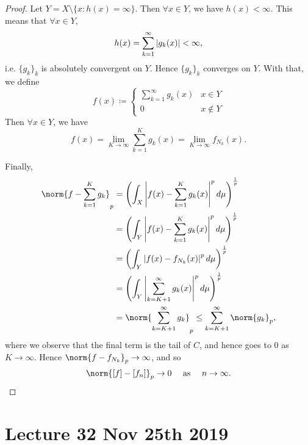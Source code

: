 \documentclass[notoc,notitlepage]{tufte-book}
\begin{document}
\begin{proof}
  Let $Y = X \setminus \{ x : h(x) = \infty \}$.
  Then $\forall x \in Y$, we have $h(x) < \infty$.
  This means that $\forall x \in Y$,
  \begin{equation*}
    h(x) = \sum_{k=1}^{\infty} \left|g_k(x)\right| < \infty,
  \end{equation*}
  i.e. $\{ g_k \}_k$ is absolutely convergent on $Y$.
  Hence $\{ g_k \}_k$ converges on $Y$.
  With that, we define
  \begin{equation*}
    f(x) \coloneqq \begin{cases}
      \sum_{k=1}^{\infty} g_k(x) & x \in Y \\
      0                          & x \notin Y
    \end{cases}
  \end{equation*}
  Then $\forall x \in Y$,  we have
  \begin{equation*}
    f(x) = \lim_{K \to \infty} \sum_{k=1}^{K} g_k(x)
    = \lim_{K \to \infty} f_{N_k}(x).
  \end{equation*}

  Finally,
  \begin{align*}
    \norm{f - \sum_{k=1}^{K} g_k}_p
    &= \left( \int_{X}
      \abs{f(x) - \sum_{k=1}^{K} g_k(x)}^p \dif{\mu}
    \right)^{\frac{1}{p}} \\
    &= \left( \int_{Y}
      \abs{f(x) - \sum_{k=1}^{K} g_k(x)}^p \dif{\mu}
    \right)^{\frac{1}{p}} \\
    &= \left( \int_{Y} \abs{f(x) - f_{N_k}(x)}^p \dif{\mu} \right)^{\frac{1}{p}} \\
    &= \left( \int_{Y}
      \abs{\sum_{k = K+1}^{\infty} g_k(x)}^p \dif{\mu}
    \right)^{\frac{1}{p}} \\
    &= \norm{ \sum_{k=K+1}^{\infty} g_k }_p
     \leq \sum_{k = K+1}^{\infty} \norm{g_k}_p,
  \end{align*}
  where we observe that the final term is the tail of $C$,
  and hence goes to $0$ as $K \to \infty$.
  Hence $\norm{f - f_{N_k}}_p \to \infty$, and so
  \begin{equation*}
    \norm{[f] - [f_n]}_p \to 0 \quad\text{ as }\quad n \to \infty.
  \end{equation*}
\end{proof}



\chapter{Lecture 32 Nov 25th 2019}%
\label{chp:lecture_32_nov_25th_2019}
\end{document}
